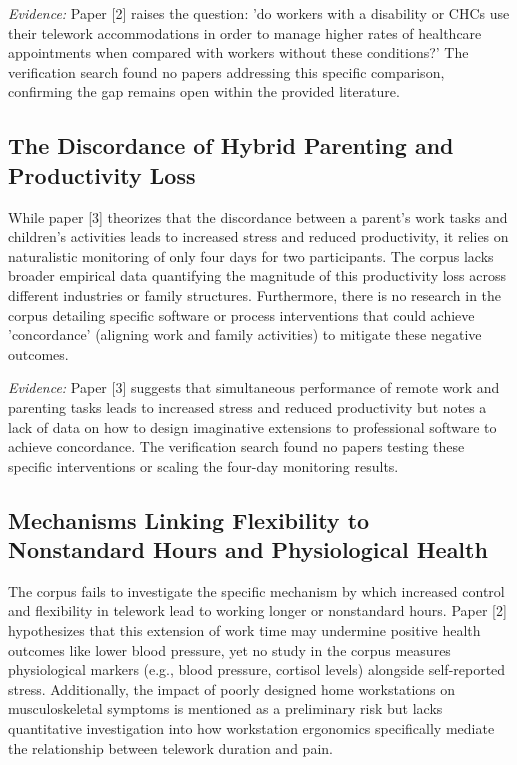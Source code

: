 \documentclass[11pt]{article}
\begin{document}
\textit{Evidence:} Paper [2] raises the question: 'do workers with a disability or CHCs use their telework accommodations in order to manage higher rates of healthcare appointments when compared with workers without these conditions?' The verification search found no papers addressing this specific comparison, confirming the gap remains open within the provided literature.

\subsection{The Discordance of Hybrid Parenting and Productivity Loss}
While paper [3] theorizes that the discordance between a parent's work tasks and children's activities leads to increased stress and reduced productivity, it relies on naturalistic monitoring of only four days for two participants. The corpus lacks broader empirical data quantifying the magnitude of this productivity loss across different industries or family structures. Furthermore, there is no research in the corpus detailing specific software or process interventions that could achieve 'concordance' (aligning work and family activities) to mitigate these negative outcomes.

\textit{Evidence:} Paper [3] suggests that simultaneous performance of remote work and parenting tasks leads to increased stress and reduced productivity but notes a lack of data on how to design imaginative extensions to professional software to achieve concordance. The verification search found no papers testing these specific interventions or scaling the four-day monitoring results.

\subsection{Mechanisms Linking Flexibility to Nonstandard Hours and Physiological Health}
The corpus fails to investigate the specific mechanism by which increased control and flexibility in telework lead to working longer or nonstandard hours. Paper [2] hypothesizes that this extension of work time may undermine positive health outcomes like lower blood pressure, yet no study in the corpus measures physiological markers (e.g., blood pressure, cortisol levels) alongside self-reported stress. Additionally, the impact of poorly designed home workstations on musculoskeletal symptoms is mentioned as a preliminary risk but lacks quantitative investigation into how workstation ergonomics specifically mediate the relationship between telework duration and pain.
\end{document}
